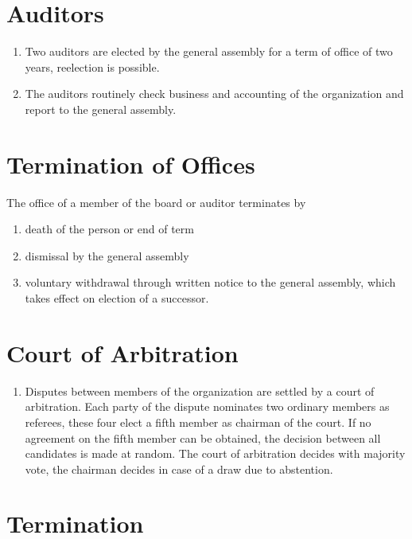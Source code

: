 \documentclass[a4paper]{article}
\begin{document}
\section{Auditors}

\begin{enumerate}
 \item Two auditors are elected by the general assembly for a term of
  office of two years, reelection is possible.
 \item The auditors routinely check business and accounting of the
  organization and report to the general assembly.
\end{enumerate}

\section{Termination of Offices}

The office of a member of the board or auditor terminates by
\begin{enumerate}
 \item death of the person or end of term
 \item dismissal by the general assembly
 \item voluntary withdrawal through written notice to the general
  assembly, which takes effect on election of a successor.
\end{enumerate}

\section{Court of Arbitration}

\begin{enumerate}
 \item Disputes between members of the organization are settled by a
  court of arbitration. Each party of the dispute nominates two
  ordinary members as referees, these four elect a fifth member as
  chairman of the court.  If no agreement on the fifth member can be
  obtained, the decision between all candidates is made at random. The
  court of arbitration decides with majority vote, the chairman
  decides in case of a draw due to abstention.

\end{enumerate}

\section{Termination}
\end{document}
